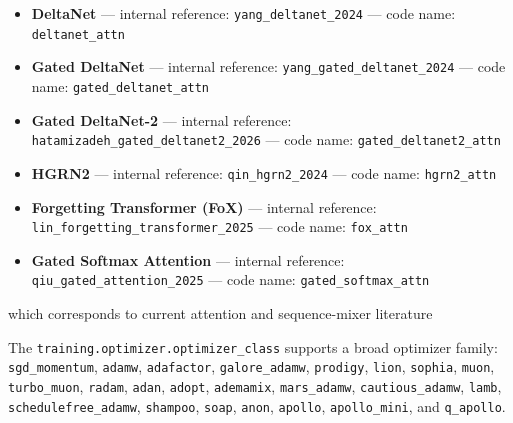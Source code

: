 \begin{itemize}[leftmargin=*]
    \item \textbf{DeltaNet} --- internal reference: \texttt{yang\_deltanet\_2024} --- code name: \texttt{deltanet\_attn}
    \item \textbf{Gated DeltaNet} --- internal reference: \texttt{yang\_gated\_deltanet\_2024} --- code name: \texttt{gated\_deltanet\_attn}
    \item \textbf{Gated DeltaNet-2} --- internal reference: \texttt{hatamizadeh\_gated\_deltanet2\_2026} --- code name: \texttt{gated\_deltanet2\_attn}
    \item \textbf{HGRN2} --- internal reference: \texttt{qin\_hgrn2\_2024} --- code name: \texttt{hgrn2\_attn}
    \item \textbf{Forgetting Transformer (FoX)} --- internal reference: \texttt{lin\_forgetting\_transformer\_2025} --- code name: \texttt{fox\_attn}
    \item \textbf{Gated Softmax Attention} --- internal reference: \texttt{qiu\_gated\_attention\_2025} --- code name: \texttt{gated\_softmax\_attn}
\end{itemize}

which corresponds to current attention and sequence-mixer literature \citep{sun_retentive_2023,gu_mamba_2023,zhang_continuous_2021,behrouz_titans_2025,ramapuram_theory_2024,vaswani_attention_2017,child_sparse_transformer_2019,beltagy_longformer_2020,zaheer_bigbird_2020,lou_sparsek_2024,yuan_nsa_2025,zhang_spargeattn_2025,wang_fasa_2026,yang_gla_2023,yang_deltanet_2024,yang_gated_deltanet_2024,hatamizadeh_gated_deltanet2_2026,qin_hgrn2_2024,lin_forgetting_transformer_2025,qiu_gated_attention_2025}

The \texttt{training.optimizer.optimizer\_class} supports a broad optimizer family:
\texttt{sgd\_momentum}, \texttt{adamw}, \texttt{adafactor}, \texttt{galore\_adamw}, \texttt{prodigy}, \texttt{lion}, \texttt{sophia}, \texttt{muon}, \texttt{turbo\_muon}, \texttt{radam}, \texttt{adan}, \texttt{adopt}, \texttt{ademamix}, \texttt{mars\_adamw}, \texttt{cautious\_adamw}, \texttt{lamb}, \texttt{schedulefree\_adamw}, \texttt{shampoo}, \texttt{soap}, \texttt{anon}, \texttt{apollo}, \texttt{apollo\_mini}, and \texttt{q\_apollo}.

